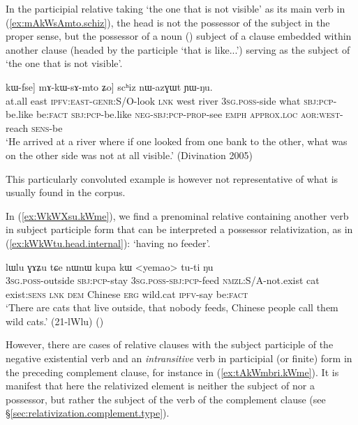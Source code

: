  In the participial relative taking  `the one that is not visible' as its main verb in (\ref{ex:mAkWsAmto.schiz}), the head  is not the possessor of the subject in the proper sense, but the possessor of a noun () subject of a clause embedded within another clause (headed by the participle  `that is like...') serving as the subject of  `the one that is not visible'.  

  \begin{exe}
\ex \label{ex:mAkWsAmto.schiz}
 \gll  [maka tɕekɯ ku-kɯ-ru tɕe tɕendi \textbf{smar} [[ɯ-βzɯr tɕʰi kɯ-fse ŋu] kɯ-fse] mɤ-kɯ-sɤ-mto ʑo] scʰiz nɯ-azɣɯt ɲɯ-ŋu. \\
 at.all east \textsc{ipfv}:\textsc{east}-\textsc{genr}:S/O-look \textsc{lnk} west river \textsc{3sg}.\textsc{poss}-side what \textsc{sbj}:\textsc{pcp}-be.like be:\textsc{fact} \textsc{sbj}:\textsc{pcp}-be.like \textsc{neg}-\textsc{sbj}:\textsc{pcp}-\textsc{prop}-see \textsc{emph} \textsc{approx}.\textsc{loc} \textsc{aor}:\textsc{west}-reach \textsc{sens}-be \\
\glt `He arrived at a river where if one looked from one bank to the other, what was on the other side was not at all visible.' (Divination 2005)
 \end{exe}
 
 This particularly convoluted example is however not representative of what is usually found in the corpus.

In (\ref{ex:WkWXsu.kWme}), we find a prenominal relative containing another verb in subject participle form that can be interpreted a possessor relativization, as in (\ref{ex:kWkWtu.head.internal}):   `having no feeder'.

\begin{exe}
\ex \label{ex:WkWXsu.kWme}
  lɯlu ɣɤʑu tɕe nɯnɯ kupa kɯ <yemao> tu-ti ŋu \\
 \textsc{3sg}.\textsc{poss}-outside \textsc{sbj}:\textsc{pcp}-stay \textsc{3sg}.\textsc{poss}-\textsc{sbj}:\textsc{pcp}-feed \textsc{nmzl}:S/A-not.exist cat exist:\textsc{sens} \textsc{lnk} \textsc{dem} Chinese \textsc{erg} wild.cat \textsc{ipfv}-say be:\textsc{fact} \\
 \glt `There are cats that live outside, that nobody feeds, Chinese people call them wild cats.' (21-lWlu)
()
 \end{exe}

However, there are cases of relative clauses with the subject participle of the negative existential verb  and an \textit{intransitive} verb in participial (or finite) form in the preceding complement clause, for instance  in (\ref{ex:tAkWmbri.kWme}). It is manifest that here the relativized element is neither the subject of  nor a possessor, but rather the subject of the verb of the complement clause  (see §\ref{sec:relativization.complement.type}).

